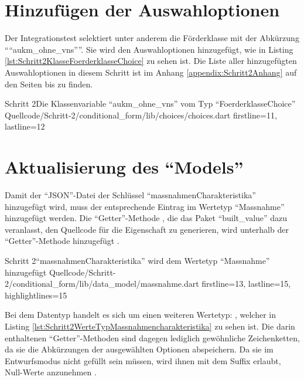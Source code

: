 \clearpage
\section{Hinzufügen der Auswahloptionen}

Der Integrationstest selektiert unter anderem die Förderklasse mit der Abkürzung \enquote{``aukm\allowbreak_ohne\allowbreak_vns''}. Sie wird den Auswahloptionen hinzugefügt, wie in Listing \ref{lst:Schritt2KlasseFoerderklasseChoice} zu sehen ist.
Die Liste aller hinzugefügten Auswahloptionen in diesem Schritt ist im Anhang \ref{appendix:Schritt2Anhang} auf den Seiten \pageref{lst:Schritt2FoerderklasseChoices} bis \pageref{lst:Schritt2hauptzielsetzungLandChoices} zu finden.

\begin{alexlisting}{Schritt 2}{Die Klassenvariable \enquote{aukm_ohne_vns} vom Typ \enquote{FoerderklasseChoice}}
  {Quellcode/Schritt-2/conditional_form/lib/choices/choices.dart}
  {firstline=11, lastline=12}
  \label{lst:Schritt2KlasseFoerderklasseChoice}
\end{alexlisting}

\section{Aktualisierung des \enquote{Models}}

Damit der \enquote{JSON}-Datei der Schlüssel \enquote{massnahmenCharakteristika} hinzugefügt wird, muss der entsprechende Eintrag im Wertetyp \enquote{Massnahme} hinzugefügt werden.
Die \enquote{Getter}-Metho\-de , die das Paket \enquote{built_value} dazu veranlasst,
den Quellcode für die Eigenschaft zu generieren, wird unterhalb der \enquote{Getter}-Methode  hinzugefügt .

\begin{alexlisting}{Schritt 2}{\enquote{massnahmenCharakteristika} wird dem Wertetyp \enquote{Massnahme} hinzugefügt}
  {Quellcode/Schritt-2/conditional_form/lib/data_model/massnahme.dart}
  {firstline=13, lastline=15, highlightlines={15}}
  \label{lst:Schritt2massnahmenCharakteristikaWirdMMassnahmeHinzugefuegt}
\end{alexlisting}

Bei dem Datentyp handelt es sich um einen weiteren Wertetyp: , welcher in Listing \ref{lst:Schritt2WerteTypMassnahmencharakteristika} zu sehen ist.
Die darin enthaltenen \enquote{Getter}-Methoden sind dagegen lediglich gewöhnliche Zeichenketten, da sie die Abkürzungen der ausgewählten Optionen abspeichern.
Da sie im Entwurfsmodus nicht gefüllt sein müssen, wird ihnen mit dem Suffix  erlaubt, Null-Werte anzunehmen .

